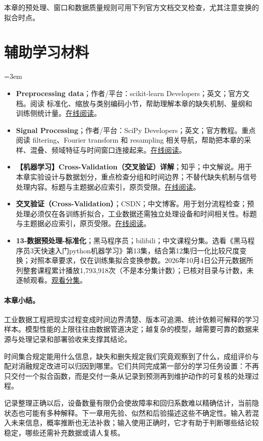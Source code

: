 本章的预处理、窗口和数据质量规则可用下列官方文档交叉检查，尤其注意变换的拟合时点。
\section*{辅助学习材料}
\begingroup
\emergencystretch=3em
\begin{itemize}
\item \textbf{Preprocessing data}；作者/平台：scikit-learn Developers；英文；官方文档。阅读 标准化、缩放与类别编码小节，帮助理解本章的缺失机制、量纲和训练侧统计量。\href{https://scikit-learn.org/stable/modules/preprocessing.html}{在线阅读}。
\item \textbf{Signal Processing}；作者/平台：SciPy Developers；英文；官方教程。重点阅读 filtering、Fourier transform 和 resampling 相关导航，帮助把本章的采样、混叠、频域特征与时间窗口连接起来。\href{https://docs.scipy.org/doc/scipy/tutorial/signal.html}{在线阅读}。
\item \textbf{【机器学习】Cross-Validation（交叉验证）详解}；知乎；中文解说。用于本章实验设计与数据划分，重点检查分组和时间边界；不替代缺失机制与信号处理内容。标题与主题据必应索引，原页受限。\href{https://zhuanlan.zhihu.com/p/24825503}{在线阅读}。
\item \textbf{交叉验证（Cross-Validation）}；CSDN；中文博客。用于划分流程检查；预处理必须仅在各训练折拟合，工业数据还需独立处理设备和时间相关性。标题与主题据必应索引，原页受限。\href{https://blog.csdn.net/weixin\_42691585/article/details/113971857}{在线阅读}。
\item \textbf{13-数据预处理-标准化}；黑马程序员；bilibili；中文课程分集。选看《黑马程序员3天快速入门python机器学习》第13集，结合第12集归一化比较尺度变换；对照本章要求，仅在训练集拟合变换参数。2026年10月4日公开元数据所列整套课程累计播放1,793,918次（不是本分集计数）；已核对目录与计数，未逐帧观看。\href{https://www.bilibili.com/video/BV1nt411r7tj/?p=13}{观看分集}。
\end{itemize}
\endgroup
\paragraph{本章小结。}
工业数据工程把现实过程变成时间边界清楚、版本可追溯、统计依赖可解释的学习样本。模型性能的上限往往由数据管道决定；越复杂的模型，越需要可靠的数据来源与处理记录和部署验收来支撑其结论。

时间集合规定能用什么信息，缺失和删失规定我们究竟观察到了什么，成组评价与配对消融规定改进可以归因到哪里。它们共同完成第一部分的学习任务设置：不再只交付一个拟合函数，而是交付一条从记录到预测再到维护动作的可复核的处理过程。

记录整理正确以后，设备数量有限仍会使故障率和回归系数难以精确估计，当前隐状态也可能有多种解释。下一章用先验、似然和后验描述这些不确定性。输入若混入未来信息，概率推断也无法补救；输入使用正确时，它才有助于判断哪些结论较稳定，哪些还需补充数据或请人复核。

